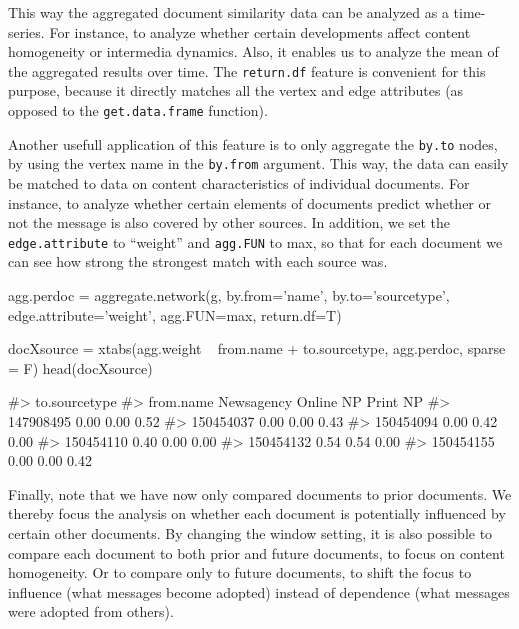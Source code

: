 This way the aggregated document similarity data can be analyzed as a
time-series. For instance, to analyze whether certain developments
affect content homogeneity or intermedia dynamics. Also, it enables us
to analyze the mean of the aggregated results over time. The
\texttt{return.df} feature is convenient for this purpose, because it
directly matches all the vertex and edge attributes (as opposed to the
\texttt{get.data.frame} function).

Another usefull application of this feature is to only aggregate the
\texttt{by.to} nodes, by using the vertex name in the \texttt{by.from}
argument. This way, the data can easily be matched to data on content
characteristics of individual documents. For instance, to analyze
whether certain elements of documents predict whether or not the message
is also covered by other sources. In addition, we set the
\texttt{edge.attribute} to ``weight'' and \texttt{agg.FUN} to max, so
that for each document we can see how strong the strongest match with
each source was.

\begin{Schunk}
\begin{Sinput}
agg.perdoc = aggregate.network(g, by.from='name', by.to='sourcetype', 
                                  edge.attribute='weight', agg.FUN=max, 
                                  return.df=T)

docXsource = xtabs(agg.weight ~ from.name + to.sourcetype, agg.perdoc, sparse = F)
head(docXsource)
\end{Sinput}
\begin{Soutput}
#>            to.sourcetype
#> from.name   Newsagency Online NP Print NP
#>   147908495       0.00      0.00     0.52
#>   150454037       0.00      0.00     0.43
#>   150454094       0.00      0.42     0.00
#>   150454110       0.40      0.00     0.00
#>   150454132       0.54      0.54     0.00
#>   150454155       0.00      0.00     0.42
\end{Soutput}
\end{Schunk}

Finally, note that we have now only compared documents to prior
documents. We thereby focus the analysis on whether each document is
potentially influenced by certain other documents. By changing the
window setting, it is also possible to compare each document to both
prior and future documents, to focus on content homogeneity. Or to
compare only to future documents, to shift the focus to influence (what
messages become adopted) instead of dependence (what messages were
adopted from others).

